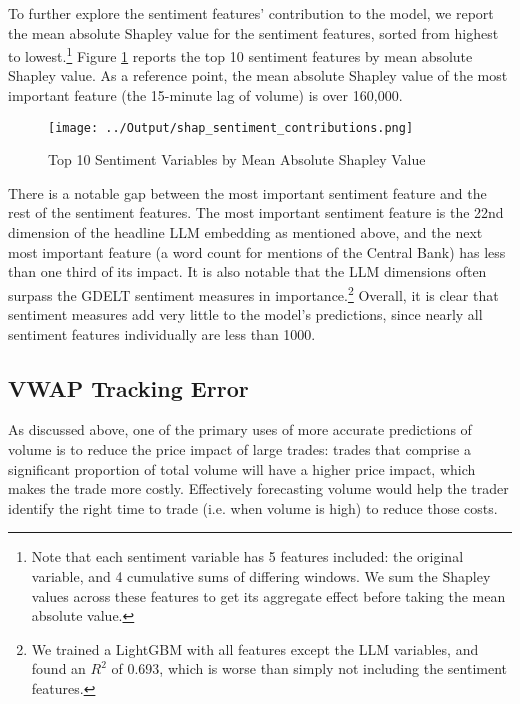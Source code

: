 \documentclass[12pt]{article}
\begin{document}
To further explore the sentiment features' contribution to the model, we report the mean absolute Shapley value for the sentiment features, sorted from highest to lowest.\footnote{Note that each sentiment variable has 5 features included: the original variable, and 4 cumulative sums of differing windows. We sum the Shapley values across these features to get its aggregate effect before taking the mean absolute value.} Figure \ref{fig:shapley_sentiment} reports the top 10 sentiment features by mean absolute Shapley value. As a reference point, the mean absolute Shapley value of the most important feature (the 15-minute lag of volume) is over 160,000.
\begin{figure}[H]
    \centering
    \caption{Top 10 Sentiment Variables by Mean Absolute Shapley Value}
    \texttt{[image: ../Output/shap\_sentiment\_contributions.png]}
    \label{fig:shapley_sentiment}
\end{figure}
There is a notable gap between the most important sentiment feature and the rest of the sentiment features. The most important sentiment feature is the 22nd dimension of the headline LLM embedding as mentioned above, and the next most important feature (a word count for mentions of the Central Bank) has less than one third of its impact. It is also notable that the LLM dimensions often surpass the GDELT sentiment measures in importance.\footnote{We trained a LightGBM with all features except the LLM variables, and found an $R^2$ of 0.693, which is worse than simply not including the sentiment features.} Overall, it is clear that sentiment measures add very little to the model's predictions, since nearly all sentiment features individually are less than 1000.

\subsection{VWAP Tracking Error}
As discussed above, one of the primary uses of more accurate predictions of volume is to reduce the price impact of large trades: trades that comprise a significant proportion of total volume will have a higher price impact, which makes the trade more costly. Effectively forecasting volume would help the trader identify the right time to trade (i.e. when volume is high) to reduce those costs.
\end{document}
